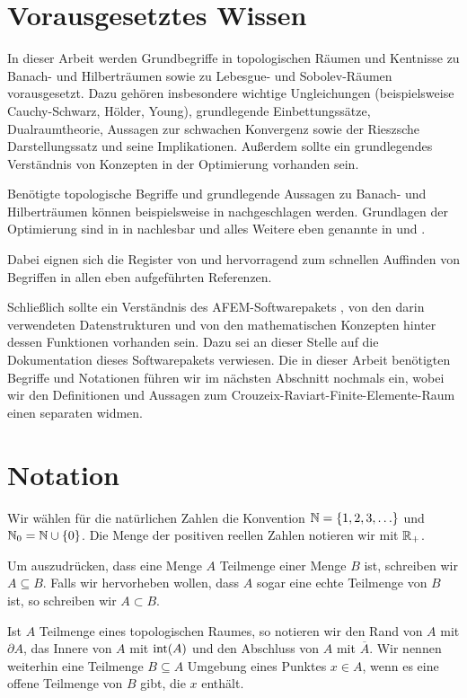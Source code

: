 \section{Vorausgesetztes Wissen}
\label{sec:basicKnowledge}

In dieser Arbeit werden Grundbegriffe in topologischen Räumen und Kentnisse zu
Banach- und Hilberträumen sowie zu Lebesgue- und Sobolev-Räumen vorausgesetzt.
Dazu gehören insbesondere wichtige Ungleichungen (beispielsweise
Cauchy-Schwarz, Hölder, Young), grundlegende Einbettungssätze, Dualraumtheorie,
Aussagen zur schwachen Konvergenz sowie der Rieszsche Darstellungssatz und
seine Implikationen.
Außerdem sollte ein grundlegendes Verständnis von Konzepten in der Optimierung
vorhanden sein.

Benötigte topologische Begriffe und grundlegende Aussagen zu Banach- und
Hilberträumen können beispielsweise in \cite{Zei86} nachgeschlagen werden.
Grundlagen der Optimierung sind in in \cite{Zei85} nachlesbar und alles Weitere
eben genannte in \cite{Zei90a} und \cite{Zei90b}. 

Dabei eignen sich die Register von \cite{Zei90b} und \cite{Zei85} hervorragend
zum schnellen Auffinden von Begriffen in allen eben aufgeführten
Referenzen.

Schließlich sollte ein Verständnis des AFEM-Softwarepakets \cite{Car09}, von
den darin verwendeten Datenstrukturen und von den mathematischen Konzepten
hinter dessen Funktionen vorhanden sein. 
Dazu sei an dieser Stelle auf die Dokumentation \cite{CGKNRR10} dieses
Softwarepakets verwiesen.
Die in dieser Arbeit benötigten Begriffe und Notationen führen wir im nächsten
Abschnitt nochmals ein, wobei wir den Definitionen und Aussagen zum
Crouzeix-Raviart-Finite-Elemente-Raum einen separaten
 widmen.


\section{Notation}
\label{sec:notation}

Wir wählen für die natürlichen Zahlen die Konvention
$\mathbb{N}=\{1,2,3,\ldots\}$ und $\mathbb{N}_0=\mathbb{N}\cup\{0\}$. 
Die Menge der positiven reellen Zahlen notieren wir mit $\mathbb{R}_+$.

Um auszudrücken, dass eine Menge $A$ Teilmenge einer Menge $B$ ist, schreiben
wir $A\subseteq B$. Falls wir hervorheben wollen, dass $A$ sogar eine echte
Teilmenge von $B$ ist, so schreiben wir $A\subset B$.

Ist $A$ Teilmenge eines topologischen Raumes, so notieren wir den Rand von $A$
mit $\partial A$, das Innere von $A$ mit $\operatorname{int}(A)$ und den Abschluss
von $A$ mit $\overline A$.
Wir nennen weiterhin eine Teilmenge $B\subseteq A$ Umgebung eines Punktes $x\in
A$, wenn es eine offene Teilmenge von $B$ gibt, die $x$ enthält.

